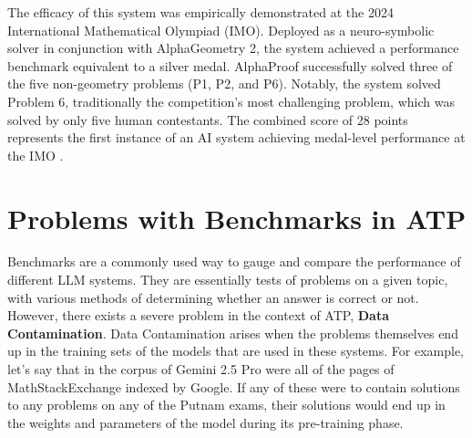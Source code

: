 \documentclass[12pt, letterpaper]{article}
\begin{document}
The efficacy of this system was empirically demonstrated at the 2024 International Mathematical Olympiad (IMO). Deployed as a neuro-symbolic solver in conjunction with AlphaGeometry 2, the system achieved a performance benchmark equivalent to a silver medal. AlphaProof successfully solved three of the five non-geometry problems (P1, P2, and P6). Notably, the system solved Problem 6, traditionally the competition's most challenging problem, which was solved by only five human contestants. The combined score of 28 points represents the first instance of an AI system achieving medal-level performance at the IMO \citep{Hubert2025Nature}.





\section{Problems with Benchmarks in ATP}
\label{sec:benchmarks}

Benchmarks are a commonly used way to gauge and compare the performance of different LLM systems. They are essentially tests of problems on a given topic, with various methods of determining whether an answer is correct or not. However, there exists a severe problem in the context of ATP, \textbf{Data Contamination}. Data Contamination arises when the problems themselves end up in the training sets of the models that are used in these systems. For example, let's say that in the corpus of Gemini 2.5 Pro were all of the pages of MathStackExchange indexed by Google. If any of these were to contain solutions to any problems on any of the Putnam exams, their solutions would end up in the weights and parameters of the model during its pre-training phase.
\end{document}
